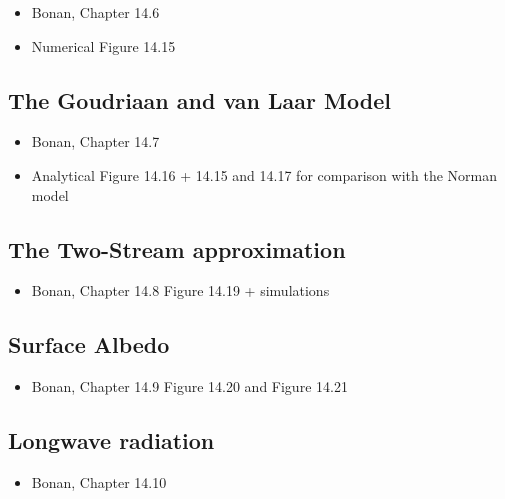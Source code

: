 \documentclass[
  oneside]{book}
\providecommand{\tightlist}{%
  \setlength{\itemsep}{0pt}\setlength{\parskip}{0pt}}
\begin{document}
\begin{itemize}
\tightlist
\item
  Bonan, Chapter 14.6
\item
  Numerical
  Figure 14.15
\end{itemize}

\hypertarget{the-goudriaan-and-van-laar-model}{%
\subsection{The Goudriaan and van Laar Model}\label{the-goudriaan-and-van-laar-model}}

\begin{itemize}
\tightlist
\item
  Bonan, Chapter 14.7
\item
  Analytical
  Figure 14.16 + 14.15 and 14.17 for comparison with the Norman model
\end{itemize}

\hypertarget{the-two-stream-approximation}{%
\subsection{The Two-Stream approximation}\label{the-two-stream-approximation}}

\begin{itemize}
\tightlist
\item
  Bonan, Chapter 14.8
  Figure 14.19 + simulations
\end{itemize}

\hypertarget{surface-albedo}{%
\subsection{Surface Albedo}\label{surface-albedo}}

\begin{itemize}
\tightlist
\item
  Bonan, Chapter 14.9
  Figure 14.20 and Figure 14.21
\end{itemize}

\hypertarget{longwave-radiation}{%
\subsection{Longwave radiation}\label{longwave-radiation}}

\begin{itemize}
\tightlist
\item
  Bonan, Chapter 14.10
\end{itemize}
\end{document}
